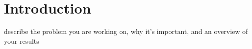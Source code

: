 \section{Introduction}
describe the problem you are working on, why it's important, and an overview of your results